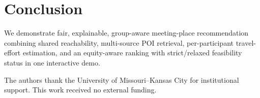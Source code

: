 \documentclass[sigconf]{acmart}
\makeatletter
\let\@vspace\@vspace@orig
\let\@vspacer\@vspacer@orig
\makeatother
\begin{document}
\section{Conclusion}
\label{sec:conclusion}

We demonstrate fair, explainable, group-aware meeting-place recommendation combining shared reachability, multi-source POI retrieval, per-participant travel-effort estimation, and an equity-aware ranking with strict/relaxed feasibility status in one interactive demo.

\begin{acks}
The authors thank the University of Missouri--Kansas City for institutional support. This work received no external funding.
\end{acks}

\FloatBarrier

{\footnotesize

\par}

\makeatletter
\let\@vspace\@vspace@orig
\let\@vspacer\@vspacer@orig
\makeatother
\end{document}
